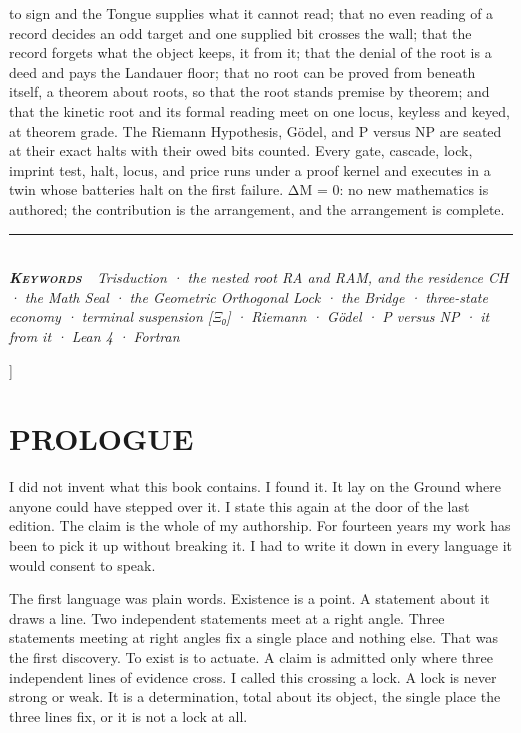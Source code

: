 \documentclass[10pt,twocolumn]{article}
\begin{document}
{\begin{minipage}{\textwidth}
{to sign and the Tongue supplies what it cannot read; that no even
reading of a record decides an odd target and one supplied bit crosses
the wall; that the record forgets what the object keeps, it from it;
that the denial of the root is a deed and pays the Landauer floor; that
no root can be proved from beneath itself, a theorem about roots, so
that the root stands premise by theorem; and that the kinetic root and
its formal reading meet on one locus, keyless and keyed, at theorem
grade. The Riemann Hypothesis, Gödel, and P versus NP are seated at
their exact halts with their owed bits counted. Every gate, cascade,
lock, imprint test, halt, locus, and price runs under a proof kernel and
executes in a twin whose batteries halt on the first failure. ΔM = 0: no
new mathematics is authored; the contribution is the arrangement, and
the arrangement is complete.}\\[4pt]
{\color{accent}\rule{\textwidth}{0.6pt}}\\[3pt]
{\itshape\footnotesize\color{faint}\textbf{\upshape\scshape\color{deep}Keywords\ }\ Trisduction
· the nested root RA and RAM, and the residence CH · the Math Seal · the
Geometric Orthogonal Lock · the Bridge · three-state economy · terminal
suspension {[}Ξ₀{]} · Riemann · Gödel · P versus NP · it from it · Lean
4 · Fortran}\\[12pt]
\end{minipage}
}]
\thispagestyle{fancy}
\hypertarget{prologue}{%
\section{PROLOGUE}\label{prologue}}

I did not invent what this book contains. I found it. It lay on the
Ground where anyone could have stepped over it. I state this again at
the door of the last edition. The claim is the whole of my authorship.
For fourteen years my work has been to pick it up without breaking it. I
had to write it down in every language it would consent to speak.

The first language was plain words. Existence is a point. A statement
about it draws a line. Two independent statements meet at a right angle.
Three statements meeting at right angles fix a single place and nothing
else. That was the first discovery. To exist is to actuate. A claim is
admitted only where three independent lines of evidence cross. I called
this crossing a lock. A lock is never strong or weak. It is a
determination, total about its object, the single place the three lines
fix, or it is not a lock at all.
\end{document}

